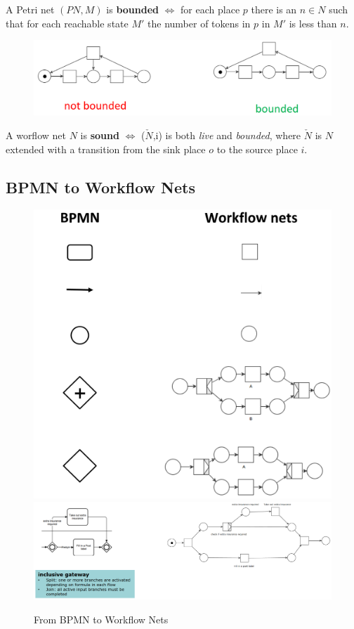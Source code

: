 A Petri net $(PN,M)$ is \textbf{bounded} $\Longleftrightarrow$ for each place $p$ there is an $n \in N$ such that for each reachable state $M'$ the number of tokens in $p$ in $M'$ is less than $n$.

\begin{figure}[htbp]
   \centering
   \includegraphics{images/wfnet_bounded.png}
   \label{fig:wfnet_bounded}
\end{figure}

\begin{theorem}   
   A worflow net $N$ is \textbf{sound} $\Longleftrightarrow$ ($\check{N}$,{i}) is both \textit{live} and \textit{bounded}, where $\check{N}$ is $N$ extended with a transition from the sink place $o$ to the source place $i$.
\end{theorem}
\subsection{BPMN to Workflow Nets}

\begin{figure}[htbp]
   \centering
   \includegraphics[width=0.5\columnwidth]{images/bpm_net1.png}
   \includegraphics{images/bpm_net2.png}
   \caption{From BPMN to Workflow Nets}
   \label{fig:bpm_net}
\end{figure}